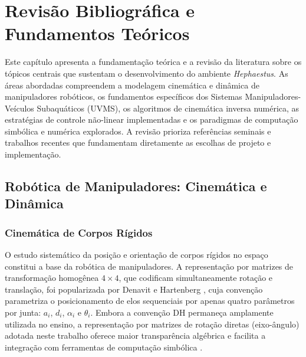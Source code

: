\chapter{Revisão Bibliográfica e Fundamentos Teóricos}
\label{cap:revisao}

Este capítulo apresenta a fundamentação teórica e a revisão da literatura sobre os tópicos centrais que sustentam o desenvolvimento do ambiente \textit{Hephaestus}. As áreas abordadas compreendem a modelagem cinemática e dinâmica de manipuladores robóticos, os fundamentos específicos dos Sistemas Manipuladores-Veículos Subaquáticos (UVMS), os algoritmos de cinemática inversa numérica, as estratégias de controle não-linear implementadas e os paradigmas de computação simbólica e numérica explorados. A revisão prioriza referências seminais e trabalhos recentes que fundamentam diretamente as escolhas de projeto e implementação.

\section{Robótica de Manipuladores: Cinemática e Dinâmica}

\subsection{Cinemática de Corpos Rígidos}

O estudo sistemático da posição e orientação de corpos rígidos no espaço constitui a base da robótica de manipuladores. A representação por matrizes de transformação homogênea $4 \times 4$, que codificam simultaneamente rotação e translação, foi popularizada por Denavit e Hartenberg \cite{denavit1955kinematic}, cuja convenção parametriza o posicionamento de elos sequenciais por apenas quatro parâmetros por junta: $a_i$, $d_i$, $\alpha_i$ e $\theta_i$. Embora a convenção DH permaneça amplamente utilizada no ensino, a representação por matrizes de rotação diretas (eixo-ângulo) adotada neste trabalho oferece maior transparência algébrica e facilita a integração com ferramentas de computação simbólica \cite{craig1989introduction, spong2020robot}.

